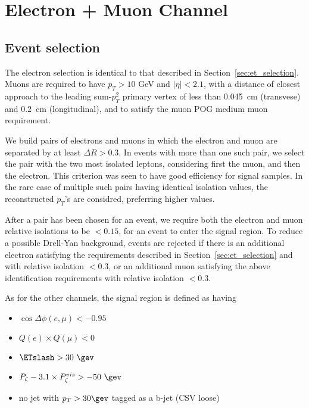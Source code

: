 \section{Electron + Muon Channel}\label{sec:eMu}

\subsection{Event selection}\label{sec:em_selection}
The electron selection is identical to that described in
Section~\ref{sec:et_selection}.  Muons are required to have $p_{T}>
10$ GeV and $\vert \eta \vert < 2.1$, with a distance of closest
approach to the leading sum-$p_T^2$ primary vertex of less than
0.045~cm (transvese) and 0.2~cm (longitudinal), and to satisfy the
muon POG medium muon requirement. %

We build pairs of electrons and muons in which the electron and muon
are separated by at least $\Delta R > 0.3$.  In events with more than
one such pair, we select the pair with the two most isolated leptons,
considering first the muon, and then the electron.  This criterion was
seen to have good efficiency for signal samples.  In the rare case of
multiple such pairs having identical isolation values, the
reconstructed $p_T$'s are considred, preferring higher values.

After a pair has been chosen for an event, we require both the
electron and muon relative isolations to be $<0.15$, for an event to
enter the signal region.  To reduce a possible Drell-Yan background,
events are rejected if there is an additional electron satisfying the
requirements described in Section~\ref{sec:et_selection} and with
relative isolation $<0.3$, or an additional muon satisfying the above
identification requirements with relative isolation $<0.3$.

As for the other channels, the signal region is defined as having
\begin{itemize}
  \item $\cos{\Delta \phi (e,\mu)}<-0.95$
  \item $Q(e) \times Q(\mu) < 0$
  \item $\ETslash>30~\gev$
  \item $P_{\zeta}- 3.1 \times P_{\zeta}^{vis} > -50~\gev$
  \item no jet with $p_T>30\gev$ tagged as a b-jet (CSV loose)
\end{itemize}

